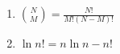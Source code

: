 

\vspace*{\fill}
\centering

\begin{enumerate}
    \item $\displaystyle \binom{N}{M} = \frac{N!}{M!(N-M)!}$ 
    \item $\displaystyle \ln{n!} = n\ln{n} - n!$
\end{enumerate}

\centering
\vspace*{\fill}

